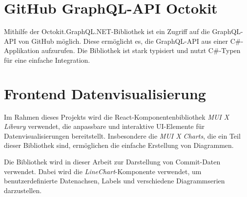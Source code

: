 \section{GitHub GraphQL-API Octokit}
Mithilfe der Octokit.GraphQL.NET-Bibliothek ist ein Zugriff auf die GraphQL-API von GitHub möglich. Diese ermöglicht es, die GraphQL-API aus einer C\#-Applikation aufzurufen. Die Bibliothek ist stark typisiert und nutzt C\#-Typen für eine einfache Integration.
\parencite{noauthor_octokitoctokitgraphqlnet_2025}


\section{Frontend Datenvisualisierung}
Im Rahmen dieses Projekts wird die React-Komponentenbibliothek \textit{MUI X Library} verwendet, die anpassbare und interaktive UI-Elemente für Datenvisualisierungen bereitstellt. Insbesondere die \textit{MUI X Charts}, die ein Teil dieser Bibliothek sind, ermöglichen die einfache Erstellung von Diagrammen.

Die Bibliothek wird in dieser Arbeit zur Darstellung von Commit-Daten verwendet. Dabei wird die \textit{LineChart}-Komponente verwendet, um benutzerdefinierte Datenachsen, Labels und verschiedene Diagrammserien darzustellen. \parencite{noauthor_react_nodate}
